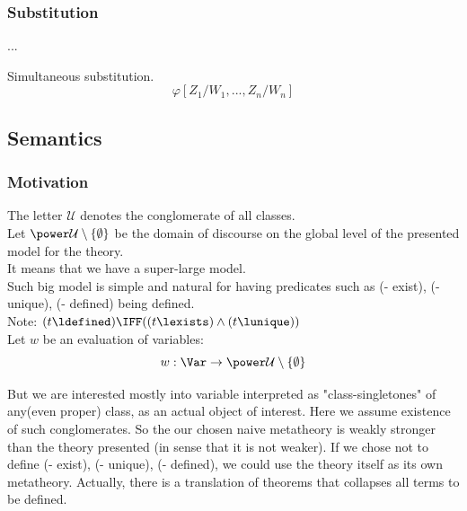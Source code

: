 \subsubsection{Substitution}%
...
\begin{definition} Simultaneous substitution.
\[
\varphi[Z_1/W_1,...,Z_n/W_n]
\]
\end{definition}
\noindent













\pagebreak
\subsection{Semantics} %
\subsubsection{Motivation}
The letter $\mathcal{U}$ denotes the conglomerate of all classes.\\

Let $\power \mathcal{U}\setminus\{\emptyset\}$ be the domain of discourse on the global level of the presented model for the theory.\\


It means that we have a super-large model.\\
Such big model is simple and natural for having predicates such as (- exist), (- unique), (- defined) being defined.\\
Note: $(t\ldefined)\IFF ((t\lexists)\land(t\lunique))$\\


Let $w$ be an evaluation of variables:\\
\[
w:\Var\to \power \mathcal{U}\setminus\{\emptyset\}
\]

But we are interested mostly into variable interpreted as "class-singletones" of any(even proper) class, as an actual object of interest.
Here we assume existence of such conglomerates. So the our chosen naive metatheory is weakly stronger than the theory presented (in sense that it is not weaker). If we chose not to define (- exist), (- unique), (- defined), we could use the theory itself as its own metatheory. Actually, there is a translation of theorems that collapses all terms to be defined.


